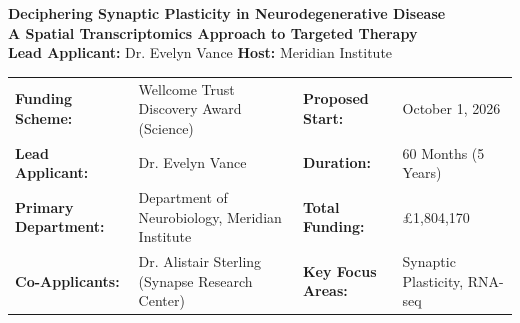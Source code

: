 \documentclass[10pt,a4paper]{article}
\begin{document}
\thispagestyle{firstpage}

\begin{center}
    \begin{tcolorbox}[
        enhanced,
        colback=bgcolor,
        colframe=primarycolor,
        arc=4pt,
        outer arc=4pt,
        leftrule=6pt,
        rightrule=1pt,
        toprule=1pt,
        bottomrule=1pt,
        left=15pt,
        right=15pt,
        top=15pt,
        bottom=15pt
    ]
        \begin{minipage}[t]{0.70\textwidth}
            {\sffamily\Huge\bfseries\color{secondarycolor} Deciphering Synaptic Plasticity in Neurodegenerative Disease}\\[0.3cm]
            {\sffamily\large\bfseries\color{primarycolor} A Spatial Transcriptomics Approach to Targeted Therapy}\\[0.15cm]
            {\sffamily\small\color{darktext}\textbf{Lead Applicant:} Dr. Evelyn Vance \quad \textbf{Host:} Meridian Institute}
        \end{minipage}%
        \hfill
        \begin{minipage}[t]{0.26\textwidth}
            \raggedleft
            \vspace{5pt}
        \end{minipage}
    \end{tcolorbox}
\end{center}

\begin{tcolorbox}[
    colback=white,
    colframe=secondarycolor!20,
    arc=3pt,
    top=8pt,
    bottom=8pt,
    left=10pt,
    right=10pt
]
    \small\sffamily
    \begin{tabularx}{\textwidth}{l X l X}
        \textbf{Funding Scheme:} & Wellcome Trust Discovery Award (Science) & \textbf{Proposed Start:} & October 1, 2026 \\
        \textbf{Lead Applicant:} & Dr. Evelyn Vance & \textbf{Duration:} & 60 Months (5 Years) \\
        \textbf{Primary Department:} & Department of Neurobiology, Meridian Institute & \textbf{Total Funding:} & \pounds 1,804,170 \\
        \textbf{Co-Applicants:} & Dr. Alistair Sterling (Synapse Research Center) & \textbf{Key Focus Areas:} & Synaptic Plasticity, RNA-seq \\
    \end{tabularx}
\end{tcolorbox}
\end{document}
